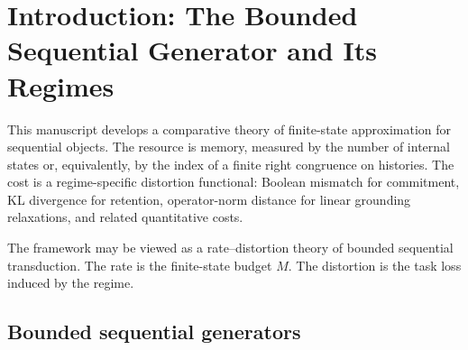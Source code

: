 \documentclass[12pt]{article}
\theoremstyle{definition}
\begin{document}
\begin{abstract}
The framework separates shared syntax from regime-specific analysis: a typed
variational schema; structural monotonicity and zero thresholds; a conditional
response-operator converse and Schatten template; adaptive oracle
inequalities with a matching minimax lower bound under explicit floors; and a
linear second-order Price-of-Safety surrogate with a Ky Fan majorization law.
A vertex correspondence organizes retention, commitment, and grounding by
R\'enyi/Schatten labels $\{0,1,\infty\}$ as a formal consistency rather
than a derivation, and no analytic theorem depends on it.  An independence
theorem shows that the three regimes' obstructions vary independently, so no
cross-regime ordering holds.  The average-case theory uses stationary
Ces\`aro or discounted prefix aggregation throughout, finite prefixes not
defining a probability measure over all lengths.  The manuscript identifies a
small set of sharply posed open research programs in place of a single
undifferentiated open problem of exact symbolic deterministic grounding.
\end{abstract}
\tableofcontents

\section{Introduction: The Bounded Sequential Generator and Its Regimes}
\label{sec:intro}

This manuscript develops a comparative theory of finite-state approximation
for sequential objects.  The resource is memory, measured by the number of
internal states or, equivalently, by the index of a finite right congruence on
histories.  The cost is a regime-specific distortion functional: Boolean
mismatch for commitment, KL divergence for retention, operator-norm distance
for linear grounding relaxations, and related quantitative costs.

The framework may be viewed as a rate--distortion theory of bounded sequential
transduction.  The rate is the finite-state budget $M$.  The distortion is the
task loss induced by the regime.

\subsection{Bounded sequential generators}
\label{subsec:bsg-intro}
\end{document}

